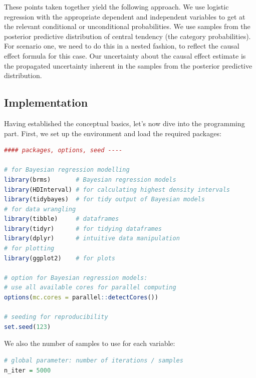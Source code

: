 \documentclass[nobib]{tufte-handout}
\begin{document}
These points taken together yield the following approach.
We use logistic regression with the appropriate dependent and independent variables to get at the relevant conditional or unconditional probabilities.
We use samples from the posterior predictive distribution of central tendency (the category probabilities).
For scenario one, we need to do this in a nested fashion, to reflect the causal effect formula for this case.
Our uncertainty about the causal effect estimate is the propagated uncertainty inherent in the samples from the posterior predictive distribution.


\subsection{Implementation}
\label{sec:implementation}

Having established the conceptual basics, let's now dive into the programming part.
%
%
First, we set up the environment and load the required packages:
%
\begin{minipage}[]{\textwidth}
\begin{lstlisting}[language=R]
#### packages, options, seed ----

# for Bayesian regression modelling
library(brms)       # Bayesian regression models
library(HDInterval) # for calculating highest density intervals
library(tidybayes)  # for tidy output of Bayesian models
# for data wrangling
library(tibble)     # dataframes
library(tidyr)      # for tidying dataframes
library(dplyr)      # intuitive data manipulation
# for plotting
library(ggplot2)    # for plots

# option for Bayesian regression models:
# use all available cores for parallel computing
options(mc.cores = parallel::detectCores())

# seeding for reproducibility
set.seed(123)
\end{lstlisting}
\end{minipage}

\vspace{-0.5cm}
We also the number of samples to use for each variable:

\begin{minipage}[]{\textwidth}
\begin{lstlisting}[language=R]
# global parameter: number of iterations / samples
n_iter = 5000
\end{lstlisting}
\end{minipage}
\end{document}
